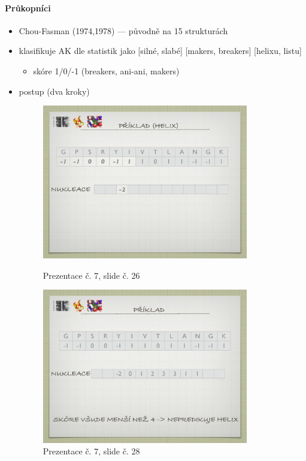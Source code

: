 \documentclass[DIV=8]{scrreprt}
\begin{document}
\paragraph{Průkopníci}
\begin{itemize}[nosep]
    \item Chou-Fasman (1974,1978) --- původně na 15 strukturách
    \item klasifikuje AK dle statistik jako [silné, slabé] [makers, breakers] [helixu, listu]
\begin{itemize}[nosep]
    \item skóre 1/0/-1 (breakers, ani-ani, makers)
\end{itemize}

    \item postup (dva kroky) \begin{figure}
    \caption{Prezentace č. 7, slide č. 26}
    \includegraphics[width=0.85\textwidth]{slides-7/slide-26.jpg}
    \centering
    \label{slides-7-slide-26}
\end{figure}
\begin{figure}
    \caption{Prezentace č. 7, slide č. 28}
    \includegraphics[width=0.85\textwidth]{slides-7/slide-28.jpg}

\end{figure}
\end{itemize}
\end{document}
